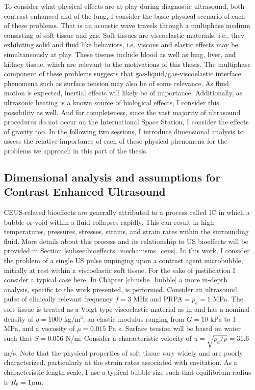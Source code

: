To consider what physical effects are at play during diagnostic
ultrasound, both contrast-enhanced and of the lung, I consider the
basic physical scenario of each of these problems. That is an acoustic
wave travels through a multiphase medium consisting of soft tissue and
gas. Soft tissues are viscoelastic materials, i.e., they exhibiting
solid and fluid like behaviors, i.e, viscous and elastic effects may
be simultaneously at play. These tissues include blood as well as
lung, liver, and kidney tissue, which are relevant to the motivations
of this thesis. The multiphase component of these problems suggests
that gas-liquid/gas-viscoelastic interface phenomena such as surface
tension may also be of some relevance. As fluid motion is expected,
inertial effects will likely be of importance. Additionally, as
ultrasonic heating is a known source of biological effects, I consider
this possibility as well. And for completeness, since the vast
majority of ultrasound procedures do not occur on the International
Space Station, I consider the effects of gravity too. In the following
two sessions, I introduce dimensional analysis to assess the relative
importance of each of these physical phenomena for the problems we
approach in this part of the thesis.

\subsection{Dimensional analysis and assumptions for Contrast Enhanced Ultrasound}
\ac{CEUS}-related bioeffects are generally attributed to a process
called \ac{IC} in which a bubble or void within a fluid collapses
rapidly. This can result in high temperatures, pressures, stresses,
strains, and strain rates within the surrounding fluid. More details
about this process and its relationship to \ac{US} bioeffects will be
provided in Section \ref{subsec:bioeffects_mechanisms_ceus}. In this
work, I consider the problem of a single \ac{US} pulse impinging upon
a contrast agent microbubble, initially at rest within a viscoelastic
soft tissue. For the sake of justification I consider a typical
case here. In Chapter \ref{ch:usbe_bubble} a more in-depth
analysis, specific to the work presented, is performed. Consider an
ultrasound pulse of clinically relevant frequency $f = 3$ MHz and
\ac{PRPA}$=p_a = 1$ MPa. The soft tissue is treated as a Voigt
type viscoelastic material as in \citep{Yang2005} and has a nominal
density of $\rho = 1000$ kg/m$^3$, an elastic modulus ranging from $G = 10$ kPa to $1$
MPa, and a viscosity of $\mu = 0.015$ Pa s. Surface tension will be
based on water such that $S = 0.056$ N/m. Consider a
characteristic velocity of $u = \sqrt{p_a/\rho} = 31.6$ m/s. Note
that the physical properties of soft tissue vary widely and are poorly
characterized, particularly at the strain rates associated with
cavitation. As a characteristic length scale, I use a typical
bubble size such that equilibrium radius is $R_0 = 1\mu$m.

